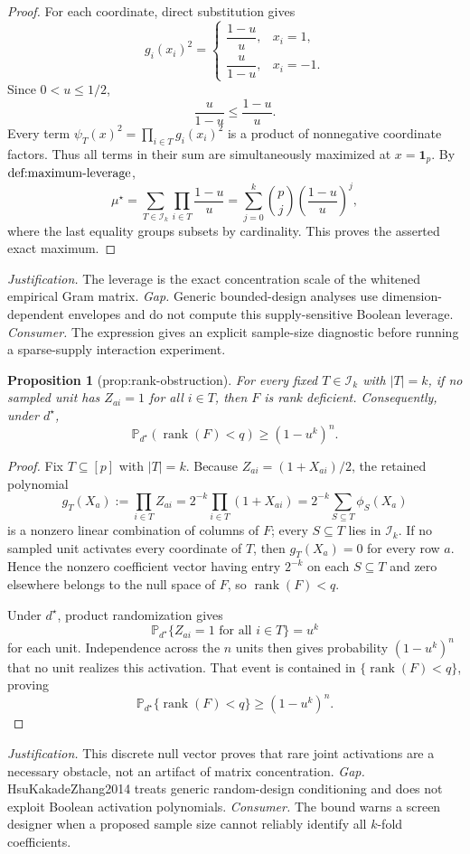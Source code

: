 \documentclass{article}
\newtheorem{proposition}{Proposition}
\begin{document}
\begin{proof}
For each coordinate, direct substitution gives
\[
 g_i(x_i)^2
 =\begin{cases}
 \dfrac{1-u}{u},&x_i=1,\\[6pt]
 \dfrac{u}{1-u},&x_i=-1.
 \end{cases}
\]
Since \(0<u\le1/2\),
\[
 \frac{u}{1-u}\le\frac{1-u}{u}.
\]
Every term \(\psi_T(x)^2=\prod_{i\in T}g_i(x_i)^2\) is a product of nonnegative coordinate factors.  Thus all terms in their sum are simultaneously maximized at \(x=\mathbf 1_p\).  By \(\textnormal{def:maximum-leverage}\),
\[
 \mu^\star
 =\sum_{T\in\mathcal I_k}\prod_{i\in T}\frac{1-u}{u}
 =\sum_{j=0}^{k}\binom pj\left(\frac{1-u}{u}\right)^j,
\]
where the last equality groups subsets by cardinality.  This proves the asserted exact maximum.
\end{proof}
\par\smallskip\noindent \textit{Justification.} The leverage is the exact concentration scale of the whitened empirical Gram matrix. \textit{Gap.} Generic bounded-design analyses use dimension-dependent envelopes and do not compute this supply-sensitive Boolean leverage. \textit{Consumer.} The expression gives an explicit sample-size diagnostic before running a sparse-supply interaction experiment.

\begin{proposition}[prop:rank-obstruction]\label{prop:rank-obstruction}
For every fixed \(T\in\mathcal I_k\) with \( |T|=k\), if no sampled unit has \(Z_{ai}=1\) for all \(i\in T\), then \(F\) is rank deficient. Consequently, under \(d^\star\), \[\mathbb P_{d^\star}(\operatorname{rank}(F)<q)\ge(1-u^k)^n.\]
\end{proposition}
\begin{proof}
Fix \(T\subseteq[p]\) with \(|T|=k\). Because \(Z_{ai}=(1+X_{ai})/2\), the retained polynomial
\[
 g_T(X_a):=\prod_{i\in T}Z_{ai}
 =2^{-k}\prod_{i\in T}(1+X_{ai})
 =2^{-k}\sum_{S\subseteq T}\phi_S(X_a)
\]
is a nonzero linear combination of columns of \(F\); every \(S\subseteq T\) lies in \(\mathcal I_k\). If no sampled unit activates every coordinate of \(T\), then \(g_T(X_a)=0\) for every row \(a\). Hence the nonzero coefficient vector having entry \(2^{-k}\) on each \(S\subseteq T\) and zero elsewhere belongs to the null space of \(F\), so \(\operatorname{rank}(F)<q\).

Under \(d^\star\), product randomization gives
\[
 \mathbb P_{d^\star}\{Z_{ai}=1\text{ for all }i\in T\}=u^k
\]
for each unit. Independence across the \(n\) units then gives probability \((1-u^k)^n\) that no unit realizes this activation. That event is contained in \(\{\operatorname{rank}(F)<q\}\), proving
\[
 \mathbb P_{d^\star}\{\operatorname{rank}(F)<q\}\ge(1-u^k)^n.
\]
\end{proof}
\par\smallskip\noindent \textit{Justification.} This discrete null vector proves that rare joint activations are a necessary obstacle, not an artifact of matrix concentration. \textit{Gap.} HsuKakadeZhang2014 treats generic random-design conditioning and does not exploit Boolean activation polynomials. \textit{Consumer.} The bound warns a screen designer when a proposed sample size cannot reliably identify all \(k\)-fold coefficients.
\end{document}
